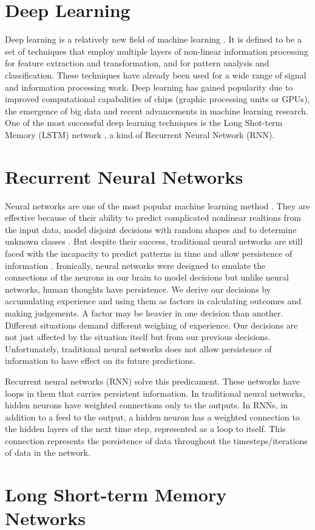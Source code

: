 \section{Deep Learning}
    Deep learning is a relatively new field of machine learning \cite{deng2014deep}. It is defined to be a set of techniques that employ multiple layers of non-linear information processing for feature extraction and transformation, and for pattern analysis and classification. These techniques have already been used for a wide range of signal and information processing work. Deep learning has gained popularity due to improved computational capabalities of chips (graphic processing units or GPUs), the emergence of big data and recent advancements in machine learning research. One of the most successful deep learning techniques is the Long Shot-term Memory (LSTM) network \cite{schmidhuber2015deep}, a kind of Recurrent Neural Network (RNN).

\section{Recurrent Neural Networks}

    Neural networks are one of the most popular machine learning method \cite{razi2005comparative}. They are effective because of their ability to predict complicated nonlinear realtions from the input data, model disjoint decisions with random shapes and to determine unknown classes \cite{huang2006real}. But despite their success, traditional neural networks are still faced with the incapacity to predict patterns in time and allow persistence of information \cite{patan2008artificial}. Ironically, neural networks were designed to emulate the connections of the neurons in our brain to model decisions but unlike neural networks, human thoughts have persistence. We derive our decisions by accumulating experience and using them as factors in calculating outcomes and making judgements. A factor may be heavier in one decision than another. Different situations demand different weighing of experience. Our decisions are not just affected by the situation itself but from our previous decisions. Unfortunately, traditional neural networks does not allow persistence of information to have effect on its future predictions.

    Recurrent neural networks (RNN) solve this predicament. These networks have loops in them that carries persistent information. In traditional neural networks, hidden neurons have weighted connections only to the outputs. In RNNs, in addition to a feed to the output, a hidden neuron has a weighted connection to the hidden layers of the next time step, represented as a loop to itself. This connection represents the persistence of data throughout the timesteps/iterations of data in the network.

\section{Long Short-term Memory Networks}
